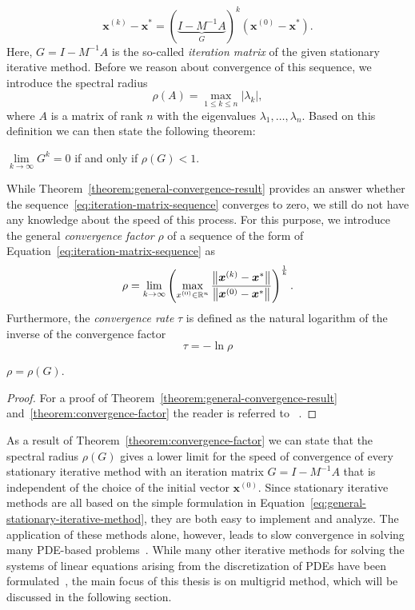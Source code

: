 \begin{equation}
	\bm{x}^{(k)} - \bm{x}^{*} = (\underbrace{I - M^{-1} A}_{G})^k (\bm{x}^{(0)} - \bm{x}^{*}).
	\label{eq:iteration-matrix-sequence}
\end{equation}
Here, $G = I - M^{-1} A$ is the so-called \emph{iteration matrix} of the given stationary iterative method.
Before we reason about convergence of this sequence, we introduce the spectral radius 
\begin{equation}
	\rho (A)=\max \limits_{1 \leq k \leq n} |\lambda _{k}|,
\end{equation}
where $A$ is a matrix of rank $n$ with the eigenvalues $\lambda_{1}, \dots, \lambda_{n}$.
Based on this definition we can then state the following theorem:
\begin{theorem}
$\lim \limits_{k \to  \infty} G^k = 0$ if and only if $\rho(G) < 1$.
\label{theorem:general-convergence-result}
\end{theorem}

While Theorem~\ref{theorem:general-convergence-result} provides an answer whether the sequence~\eqref{eq:iteration-matrix-sequence} converges to zero, we still do not have any knowledge about the speed of this process.
For this purpose, we introduce the general \emph{convergence factor} $\rho$ of a sequence of the form of Equation~\eqref{eq:iteration-matrix-sequence} as
\begin{equation}
	\rho = \lim \limits_{k \to  \infty} \left( \max \limits_{x^{(0)} \in \mathbb{R}^{n}} \frac{\norm{\bm{x}^{(k)} - \bm{x}^{*}}}{\norm{\bm{x}^{(0)} - \bm{x}^{*}}} \right)^{\frac{1}{k}}.
\end{equation} 
Furthermore, the \emph{convergence rate} $\tau$ is defined as the natural logarithm of the inverse of the convergence factor
\begin{equation}
	\tau = -\ln \rho
\end{equation}
\begin{theorem}
	$\rho = \rho(G)$.
	\label{theorem:convergence-factor}
\end{theorem}
\begin{proof}
	For a proof of Theorem~\ref{theorem:general-convergence-result} and~\ref{theorem:convergence-factor} the reader is referred to ~\cite{varga1962iterative,saad2003iterative}.
\end{proof}
As a result of Theorem~\ref{theorem:convergence-factor} we can state that the spectral radius $\rho(G)$ gives a lower limit for the speed of convergence of every stationary iterative method with an iteration matrix $G = I - M^{-1} A$ that is independent of the choice of the initial vector $\bm{x}^{(0)}$.
Since stationary iterative methods are all based on the simple formulation in Equation~\eqref{eq:general-stationary-iterative-method}, they are both easy to implement and analyze.
The application of these methods alone, however, leads to slow convergence in solving many PDE-based problems~\cite{briggs2000multigrid}.
While many other iterative methods for solving the systems of linear equations arising from the discretization of PDEs have been formulated~\cite{saad2003iterative}, the main focus of this thesis is on multigrid method, which will be discussed in the following section.


